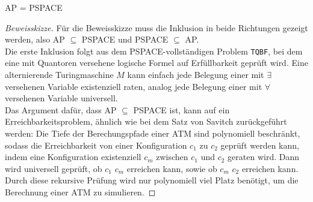 \begin{theorem}
    AP = PSPACE
\end{theorem}

\begin{proof}[Beweisskizze] \cite{arora_computational_2009} \cite{sipser_introduction_2006}
    Für die Beweisskizze muss die Inklusion in beide Richtungen gezeigt werden, also AP $\subseteq$ PSPACE und PSPACE $\subseteq$ AP. \\
    Die erste Inklusion folgt aus dem PSPACE-vollständigen Problem \texttt{TQBF}, bei dem eine mit Quantoren versehene logische Formel auf Erfüllbarkeit geprüft wird.
    Eine alternierende Turingmaschine $M$ kann einfach jede Belegung einer mit $\exists$ versehenen Variable existenziell raten, analog jede Belegung einer mit $\forall$ 
    versehenen Variable universell.\\
    Das Argument dafür, dass AP $\subseteq$ PSPACE ist, kann auf ein Erreichbarkeitsproblem, ähnlich wie bei dem Satz von Savitch zurückgeführt werden:
    Die Tiefe der Berechungspfade einer ATM sind polynomiell beschränkt, sodass die Erreichbarkeit von einer Konfiguration $c_1$ zu $c_2$ geprüft werden kann, indem eine Konfiguration existenziell $c_m$
    zwischen $c_1$ und $c_2$ geraten wird. Dann wird universell geprüft, ob $c_1$ $c_m$ erreichen kann, sowie ob $c_m$ $c_2$ erreichen kann.
    Durch diese rekursive Prüfung wird nur polynomiell viel Platz benötigt, um die Berechnung einer ATM zu simulieren. 
\end{proof}
